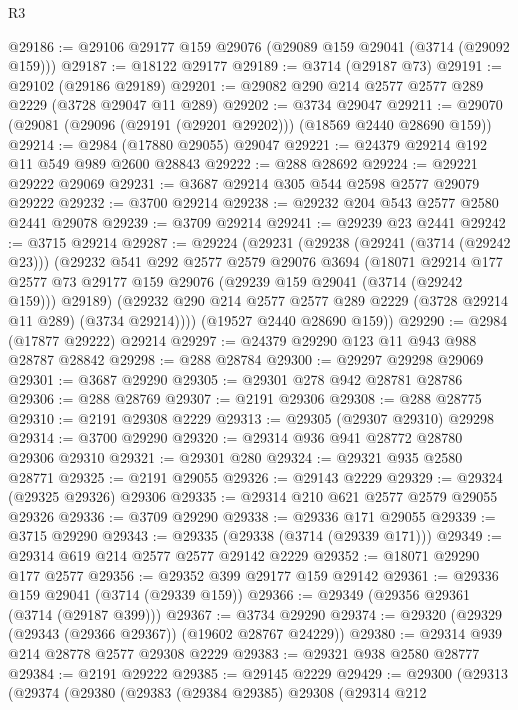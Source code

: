\begin{lexlean}{R3}
\begin{coremodule}
@29186 := @29106 @29177 @159 @29076 (@29089 @159 @29041 (@3714 (@29092 @159)))
@29187 := @18122 @29177
@29189 := @3714 (@29187 @73)
@29191 := @29102 (@29186 @29189)
@29201 := @29082 @290 @214 @2577 @2577 @289 @2229 (@3728 @29047 @11 @289)
@29202 := @3734 @29047
@29211 := @29070 (@29081 (@29096 (@29191 (@29201 @29202))) (@18569 @2440 @28690 @159))
@29214 := @2984 (@17880 @29055) @29047
@29221 := @24379 @29214 @192 @11 @549 @989 @2600 @28843
@29222 := @288 @28692
@29224 := @29221 @29222 @29069
@29231 := @3687 @29214 @305 @544 @2598 @2577 @29079 @29222
@29232 := @3700 @29214
@29238 := @29232 @204 @543 @2577 @2580 @2441 @29078
@29239 := @3709 @29214
@29241 := @29239 @23 @2441
@29242 := @3715 @29214
@29287 := @29224
    (@29231
      (@29238
        (@29241 (@3714 (@29242 @23)))
        (@29232
          @541
          @292
          @2577
          @2579
          @29076
          @3694
          (@18071
            @29214
            @177
            @2577
            @73
            @29177
            @159
            @29076
            (@29239 @159 @29041 (@3714 (@29242 @159)))
            @29189)
          (@29232 @290 @214 @2577 @2577 @289 @2229 (@3728 @29214 @11 @289) (@3734 @29214))))
      (@19527 @2440 @28690 @159))
@29290 := @2984 (@17877 @29222) @29214
@29297 := @24379 @29290 @123 @11 @943 @988 @28787 @28842
@29298 := @288 @28784
@29300 := @29297 @29298 @29069
@29301 := @3687 @29290
@29305 := @29301 @278 @942 @28781 @28786
@29306 := @288 @28769
@29307 := @2191 @29306
@29308 := @288 @28775
@29310 := @2191 @29308 @2229
@29313 := @29305 (@29307 @29310) @29298
@29314 := @3700 @29290
@29320 := @29314 @936 @941 @28772 @28780 @29306 @29310
@29321 := @29301 @280
@29324 := @29321 @935 @2580 @28771
@29325 := @2191 @29055
@29326 := @29143 @2229
@29329 := @29324 (@29325 @29326) @29306
@29335 := @29314 @210 @621 @2577 @2579 @29055 @29326
@29336 := @3709 @29290
@29338 := @29336 @171 @29055
@29339 := @3715 @29290
@29343 := @29335 (@29338 (@3714 (@29339 @171)))
@29349 := @29314 @619 @214 @2577 @2577 @29142 @2229
@29352 := @18071 @29290 @177 @2577
@29356 := @29352 @399 @29177 @159 @29142
@29361 := @29336 @159 @29041 (@3714 (@29339 @159))
@29366 := @29349 (@29356 @29361 (@3714 (@29187 @399)))
@29367 := @3734 @29290
@29374 := @29320 (@29329 (@29343 (@29366 @29367)) (@19602 @28767 @24229))
@29380 := @29314 @939 @214 @28778 @2577 @29308 @2229
@29383 := @29321 @938 @2580 @28777
@29384 := @2191 @29222
@29385 := @29145 @2229
@29429 := @29300
    (@29313
      (@29374
        (@29380
          (@29383
            (@29384 @29385)
            @29308
            (@29314
              @212

\end{coremodule}
\end{lexlean}

